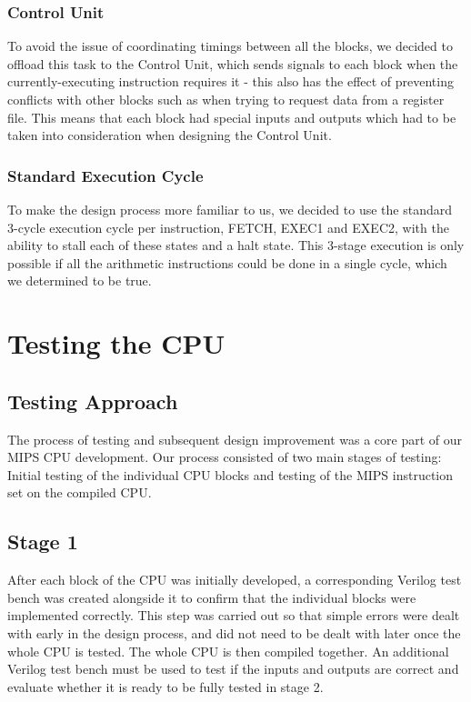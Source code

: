 \documentclass{article}
\begin{document}
\subsubsection{Control Unit}
To avoid the issue of coordinating timings between all the blocks, we decided to offload this task to the Control Unit, which sends signals to each block when the currently-executing instruction requires it - this also has the effect of preventing conflicts with other blocks such as when trying to request data from a register file. This means that each block had special inputs and outputs which had to be taken into consideration when designing the Control Unit.

\subsubsection{Standard Execution Cycle}
To make the design process more familiar to us, we decided to use the standard 3-cycle execution cycle per instruction, FETCH, EXEC1 and EXEC2, with the ability to stall each of these states and a halt state. This 3-stage execution is only possible if all the arithmetic instructions could be done in a single cycle, which we determined to be true.

\section{Testing the CPU}

\subsection{Testing Approach}

The process of testing and subsequent design improvement was a core part of our MIPS CPU development. Our process consisted of two main stages of testing: Initial testing of the individual CPU blocks and testing of the MIPS instruction set on the compiled CPU. 

\subsection{Stage 1}

After each block of the CPU was initially developed, a corresponding Verilog test bench was created alongside it to confirm that the individual blocks were implemented correctly. This step was carried out so that simple errors were dealt with early in the design process, and did not need to be dealt with later once the whole CPU is tested. The whole CPU is then compiled together. An additional Verilog test bench must be used to test if the inputs and outputs are correct and evaluate whether it is ready to be fully tested in stage 2.
\end{document}
